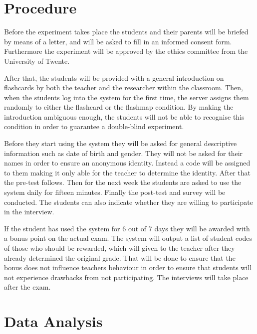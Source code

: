 \section{Procedure}



Before the experiment takes place the students and their parents will be briefed by means of a letter, and will be asked to fill in an informed consent form. Furthermore the experiment will be approved by the ethics committee from the University of Twente.

After that, the students will be provided with a general introduction on flashcards by both the teacher and the researcher within the classroom. Then, when the students log into the system for the first time, the server assigns them randomly to either the flashcard or the flashmap condition. By making the introduction ambiguous enough, the students will not be able to recognise this condition in order to guarantee a double-blind experiment.

Before they start using the system they will be asked for general descriptive information such as date of birth and gender. They will not be asked for their names in order to ensure an anonymous identity. Instead a code will be assigned to them making it only able for the teacher to determine the identity. After that the pre-test follows. Then for the next week the students are asked to use the system daily for fifteen minutes. Finally the post-test and survey will be conducted. The students can also indicate whether they are willing to participate in the interview.

If the student has used the system for 6 out of 7 days they will be awarded with a bonus point on the actual exam. The system will output a list of student codes of those who should be rewarded, which will given to the teacher after they already determined the original grade. That will be done to ensure that the bonus does not influence teachers behaviour in order to ensure that students will not experience drawbacks from not participating. The interviews will take place after the exam.

\section{Data Analysis}

